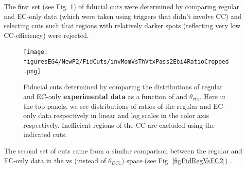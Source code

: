 The first set (see Fig. \ref{figFidRegVsEC1}) of fiducial cuts  were determined by comparing regular and EC-only data (which were taken using triggers that didn't involve CC) and selecting cuts such that regions with relatively darker spots (reflecting very low CC-efficiency) were rejected.

\begin{figure}[H]%
\centering
\leavevmode \texttt{[image: figuresEG4/NewP2/FidCuts/invMomVsThVtxPass2Ebi4RatioCropped.png]}
\caption[Fiducial cuts]{Fiducial cuts determined by comparing the distributions of regular and EC-only {\bf experimental data} as a function of \invP and $\theta_{vtx}$. %
Here in the top panels, we see distributions of ratios of the regular and EC-only data respectively in linear and log scales in the color axis respectively. Inefficient regions of the CC are excluded using the indicated cuts.} %
\label{figFidRegVsEC1}
\end{figure}

The second set of cuts came from a similar comparison between the regular and EC-only data in the \invP vs \thvtx (instead of $\theta_{DC1}$) space (see Fig. \ref{figFidRegVsEC2}) .

